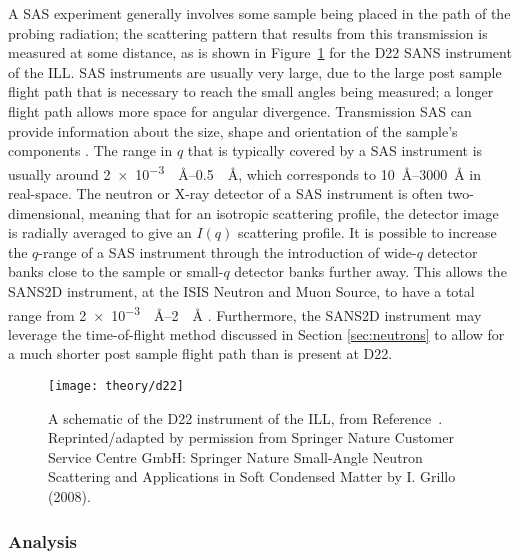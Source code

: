 A SAS experiment generally involves some sample being placed in the path of the probing radiation; the scattering pattern that results from this transmission is measured at some distance, as is shown in Figure~\ref{fig:sasgeo} for the D22 SANS instrument of the ILL.
SAS instruments are usually very large, due to the large post sample flight path that is necessary to reach the small angles being measured; a longer flight path allows more space for angular divergence.
Transmission SAS can provide information about the size, shape and orientation of the sample's components \cite{willis_experimental_2009}.
The range in $q$ that is typically covered by a SAS instrument is usually around \SIrange{2e-3}{0.5}{\per\angstrom}, which corresponds to \SIrange{10}{3000}{\angstrom} in real-space. The neutron or X-ray detector of a SAS instrument is often two-dimensional, meaning that for an isotropic scattering profile, the detector image is radially averaged to give an $I(q)$ scattering profile.
It is possible to increase the $q$-range of a SAS instrument through the introduction of wide-$q$ detector banks close to the sample or small-$q$ detector banks further away.
This allows the SANS2D instrument, at the ISIS Neutron and Muon Source, to have a total range from \SIrange{2e-3}{2}{\per\angstrom} \cite{noauthor_isis_nodate}.
Furthermore, the SANS2D instrument may leverage the time-of-flight method discussed in Section \ref{sec:neutrons} to allow for a much shorter post sample flight path than is present at D22.
%
\begin{figure}
    \centering
    \texttt{[image: theory/d22]}
    \caption{A schematic of the D22 instrument of the ILL, from Reference~\cite{grillo_small-angle_2008}. Reprinted/adapted by permission from Springer Nature Customer Service Centre GmbH: Springer Nature Small-Angle Neutron Scattering and Applications in Soft Condensed Matter by I. Grillo\textsuperscript{\textcopyright} (2008).}
    \label{fig:sasgeo}
\end{figure}
%

\subsubsection{Analysis}

